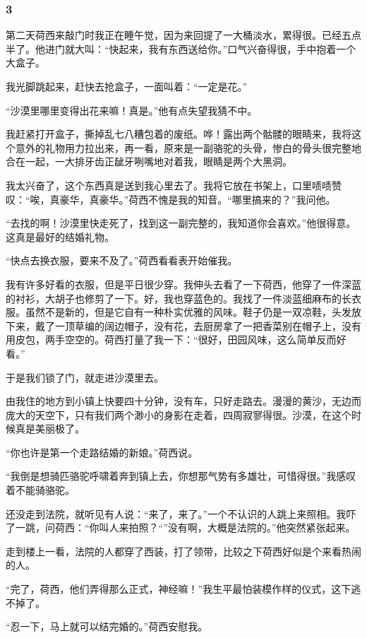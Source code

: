 \subsubsection*{3}
\par 第二天荷西来敲门时我正在睡午觉，因为来回提了一大桶淡水，累得很。已经五点半了。他进门就大叫：“快起来，我有东西送给你。”口气兴奋得很，手中抱着一个大盒子。
\par 我光脚跳起来，赶快去抢盒子，一面叫着：“一定是花。”
\par “沙漠里哪里变得出花来嘛！真是。”他有点失望我猜不中。
\par 我赶紧打开盒子，撕掉乱七八糟包着的废纸。哗！露出两个骷髅的眼睛来，我将这个意外的礼物用力拉出来，再一看，原来是一副骆驼的头骨，惨白的骨头很完整地合在一起，一大排牙齿正龇牙咧嘴地对着我，眼睛是两个大黑洞。
\par 我太兴奋了，这个东西真是送到我心里去了。我将它放在书架上，口里啧啧赞叹：“唉，真豪华，真豪华。”荷西不愧是我的知音。“哪里搞来的？”我问他。
\par “去找的啊！沙漠里快走死了，找到这一副完整的，我知道你会喜欢。”他很得意。这真是最好的结婚礼物。
\par “快点去换衣服，要来不及了。”荷西看看表开始催我。
\par 我有许多好看的衣服，但是平日很少穿。我伸头去看了一下荷西，他穿了一件深蓝的衬衫，大胡子也修剪了一下。好，我也穿蓝色的。我找了一件淡蓝细麻布的长衣服。虽然不是新的，但是它自有一种朴实优雅的风味。鞋子仍是一双凉鞋，头发放下来，戴了一顶草编的阔边帽子，没有花，去厨房拿了一把香菜别在帽子上，没有用皮包，两手空空的。荷西打量了我一下：“很好，田园风味，这么简单反而好看。”
\par 于是我们锁了门，就走进沙漠里去。
\par 由我住的地方到小镇上快要四十分钟，没有车，只好走路去。漫漫的黄沙，无边而庞大的天空下，只有我们两个渺小的身影在走着，四周寂寥得很。沙漠，在这个时候真是美丽极了。
\par “你也许是第一个走路结婚的新娘。”荷西说。
\par “我倒是想骑匹骆驼呼啸着奔到镇上去，你想那气势有多雄壮，可惜得很。”我感叹着不能骑骆驼。
\par 还没走到法院，就听见有人说：“来了，来了。”一个不认识的人跳上来照相。我吓了一跳，问荷西：“你叫人来拍照？“”没有啊，大概是法院的。”他突然紧张起来。
\par 走到楼上一看，法院的人都穿了西装，打了领带，比较之下荷西好似是个来看热闹的人。
\par “完了，荷西，他们弄得那么正式，神经嘛！”我生平最怕装模作样的仪式，这下逃不掉了。
\par “忍一下，马上就可以结完婚的。”荷西安慰我。
